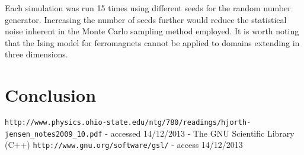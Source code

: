\documentclass[11pt]{article}   	%
\begin{document}
Each simulation was run 15 times using different seeds for the random number generator. Increasing the number of seeds further would reduce the statistical noise inherent in the Monte Carlo sampling method employed. It is worth noting that the Ising model for ferromagnets cannot be applied to domains extending in three dimensions.

\section{Conclusion}

\begin{thebibliography}{10}
 \texttt{http://www.physics.ohio-state.edu/ntg/780/readings/hjorth-jensen\_notes2009\_10.pdf} - accessed 14/12/2013
 - The GNU Scientific Library (C++) \texttt{http://www.gnu.org/software/gsl/} - access 14/12/2013
\end{thebibliography}
\end{document}
